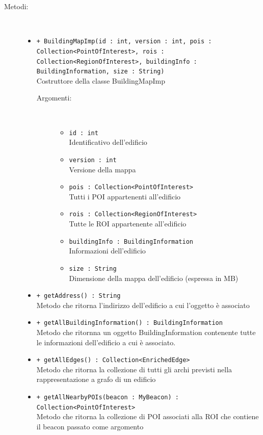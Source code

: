 \documentclass[../DefinizioneDiProdotto.tex]{subfiles}
\begin{document}
\begin{description}
\begin{itemize}
\end{itemize}
\item[Metodi:] \
\begin{itemize}
\item \texttt{+ BuildingMapImp(id : int, version : int, pois : Collection<PointOfInterest>, rois : Collection<RegionOfInterest>, buildingInfo : BuildingInformation, size : String)}\\
Costruttore della classe BuildingMapImp
 \begin{description}
\item[Argomenti:] \
\begin{itemize}
\item \texttt{id : int}\\
Identificativo dell'edificio\item \texttt{version : int}\\
Versione della mappa\item \texttt{pois : Collection<PointOfInterest>}\\
Tutti i POI appartenenti all'edificio\item \texttt{rois : Collection<RegionOfInterest>}\\
Tutte le ROI appartenente all'edificio\item \texttt{buildingInfo : BuildingInformation}\\
Informazioni dell'edificio\item \texttt{size : String}\\
Dimensione della mappa dell'edificio (espressa in MB)\end{itemize}
\end{description}
\item \texttt{+ getAddress() : String}\\
Metodo che ritorna l'indirizzo dell'edificio a cui l'oggetto è associato
 \item \texttt{+ getAllBuildingInformation() : BuildingInformation}\\
Metodo che ritornna un oggetto BuildingInformation contenente tutte le informazioni dell'edificio a cui è associato.
 \item \texttt{+ getAllEdges() : Collection<EnrichedEdge>}\\
Metodo che ritorna la collezione di tutti gli archi previsti nella rappresentazione a grafo di un edificio
 \item \texttt{+ getAllNearbyPOIs(beacon : MyBeacon) : Collection<PointOfInterest>}\\
Metodo che ritorna la collezione di POI associati alla ROI che contiene il beacon passato come argomento

\end{itemize}
\end{description}
\end{document}
